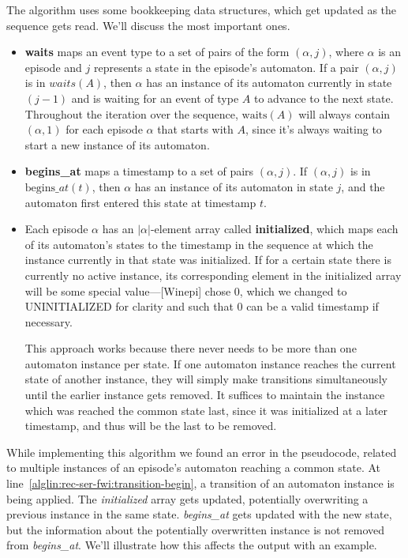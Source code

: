 The algorithm uses some bookkeeping data structures, which get updated as the sequence gets read. We'll discuss the most important ones.
\begin{itemize}
\item \textbf{waits} maps an event type to a set of pairs of the form $ (\alpha, j) $, where $ \alpha $ is an episode and $ j $ represents a state in the episode's automaton. If a pair $ (\alpha, j) $ is in $ waits(A) $, then $ \alpha $ has an instance of its automaton currently in state $ (j - 1) $ and is waiting for an event of type $ A $ to advance to the next state. Throughout the iteration over the sequence, $ \text{waits}(A) $ will always contain $ (\alpha, 1) $ for each episode $ \alpha $ that starts with $ A $, since it's always waiting to start a new instance of its automaton.
\item \textbf{begins\_at} maps a timestamp to a set of pairs $ (\alpha, j) $. If $ (\alpha, j) $ is in $ \text{begins}\_at(t) $, then $ \alpha $ has an instance of its automaton in state $ j $, and the automaton first entered this state at timestamp $ t $.
\item Each episode $ \alpha $ has an $ | \alpha | $-element array called \textbf{initialized}, which maps each of its automaton's states to the timestamp in the sequence at which the instance currently in that state was initialized. If for a certain state there is currently no active instance, its corresponding element in the initialized array will be some special value---[Winepi] chose 0, which we changed to UNINITIALIZED for clarity and such that 0 can be a valid timestamp if necessary.

This approach works because there never needs to be more than one automaton instance per state. If one automaton instance reaches the current state of another instance, they will simply make transitions simultaneously until the earlier instance gets removed. It suffices to maintain the instance which was reached the common state last, since it was initialized at a later timestamp, and thus will be the last to be removed.
\end{itemize}

While implementing this algorithm we found an error in the pseudocode, related to multiple instances of an episode's automaton reaching a common state. At line~\ref{alglin:rec-ser-fwi:transition-begin}, a transition of an automaton instance is being applied. The \emph{initialized} array gets updated, potentially overwriting a previous instance in the same state. \emph{begins\_at} gets updated with the new state, but the information about the potentially overwritten instance is not removed from \emph{begins\_at}. We'll illustrate how this affects the output with an example.

